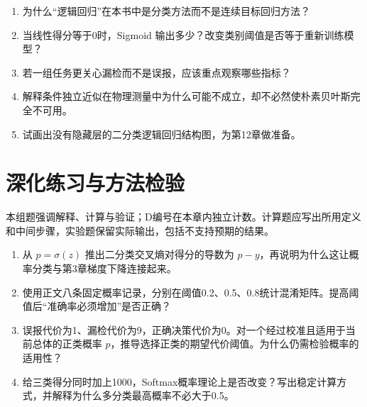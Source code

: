 \chapterexercise
\begin{enumerate}
\item 为什么“逻辑回归”在本书中是分类方法而不是连续目标回归方法？
\item 当线性得分等于0时，Sigmoid 输出多少？改变类别阈值是否等于重新训练模型？
\item 若一组任务更关心漏检而不是误报，应该重点观察哪些指标？
\item 解释条件独立近似在物理测量中为什么可能不成立，却不必然使朴素贝叶斯完全不可用。
\item 试画出没有隐藏层的二分类逻辑回归结构图，为第12章做准备。
\end{enumerate}

\section*{深化练习与方法检验}
本组题强调解释、计算与验证；D编号在本章内独立计数。计算题应写出所用定义和中间步骤，实验题保留实际输出，包括不支持预期的结果。
\begin{enumerate}[label=D\arabic*.]
\item 从 $p=\sigma(z)$ 推出二分类交叉熵对得分的导数为 $p-y$，再说明为什么这让概率分类与第3章梯度下降连接起来。
\item 使用正文八条固定概率记录，分别在阈值0.2、0.5、0.8统计混淆矩阵。提高阈值后“准确率必须增加”是否正确？
\item 误报代价为1、漏检代价为9，正确决策代价为0。对一个经过校准且适用于当前总体的正类概率 $p$，推导选择正类的期望代价阈值。为什么仍需检验概率的适用性？
\item 给三类得分同时加上1000，Softmax概率理论上是否改变？写出稳定计算方式，并解释为什么多分类最高概率不必大于0.5。
\end{enumerate}
